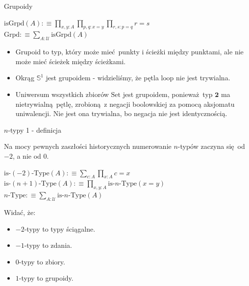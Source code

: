 \documentclass{beamer}
\newcommand{\defn}{:\equiv}
\newcommand{\U}{\mathcal{U}}
\newcommand{\isGrpd}{\text{isGrpd}}
\newcommand{\Set}{\text{Set}}
\newcommand{\Grpd}{\text{Grpd}}
\newcommand{\hS}{\mathbb{S}^1}
\newcommand{\looop}{\text{loop}}
\begin{document}
\begin{frame}{Grupoidy}

\begin{definition}
$\isGrpd(A) \defn \prod_{x, y : A} \prod_{p, q : x = y} \prod_{r, s : p = q} r = s$ \\
$\Grpd \defn \sum_{A : \U} \isGrpd(A)$
\end{definition}

\begin{itemize}
	\item Grupoid to typ, który może mieć punkty i ścieżki między punktami, ale nie może mieć ścieżek między ścieżkami.
	\item Okrąg $\hS$ jest grupoidem - widzieliśmy, że pętla $\looop$ nie jest trywialna.
	\item Uniwersum wszystkich zbiorów $\Set$ jest grupoidem, ponieważ typ $\mathbf{2}$ ma nietrywialną pętlę, zrobioną z negacji boolowskiej za pomocą aksjomatu uniwalencji. Nie jest ona trywialna, bo negacja nie jest identycznością.
\end{itemize}

\end{frame}

\begin{frame}{$n$-typy 1 - definicja}

Na mocy pewnych zaszłości historycznych numerowanie $n$-typów zaczyna się od $-2$, a nie od $0$.

\begin{definition}[$n$-typ]
$\text{is-}(-2)\text{-Type}(A) \defn \sum_{c : A} \prod_{x : A} c = x$ \\
$\text{is-}(n + 1)\text{-Type}(A) \defn \prod_{x, y : A} \text{is-}n\text{-Type}(x = y)$ \\
$n\text{-Type} \defn \sum_{A : \U} \text{is-}n\text{-Type}(A)$
\end{definition}

Widać, że:
\begin{itemize}
	\item $-2$-typy to typy ściągalne.
	\item $-1$-typy to zdania.
	\item $0$-typy to zbiory.
	\item $1$-typy to grupoidy.
\end{itemize}

\end{frame}
\end{document}
